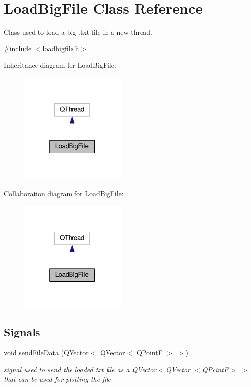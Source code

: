 \hypertarget{classLoadBigFile}{}\section{Load\+Big\+File Class Reference}
\label{classLoadBigFile}


Class used to load a big .txt file in a new thread.  




{\ttfamily \#include $<$loadbigfile.\+h$>$}



Inheritance diagram for Load\+Big\+File\+:
\nopagebreak
\begin{figure}[H]
\begin{center}
\leavevmode
\includegraphics[width=148pt]{classLoadBigFile__inherit__graph}
\end{center}
\end{figure}


Collaboration diagram for Load\+Big\+File\+:
\nopagebreak
\begin{figure}[H]
\begin{center}
\leavevmode
\includegraphics[width=148pt]{classLoadBigFile__coll__graph}
\end{center}
\end{figure}
\subsection*{Signals}
\begin{DoxyCompactItemize}
\item 
void \hyperlink{classLoadBigFile_ad0c00cd9faeeb4e03a94f530152c69d9}{send\+File\+Data} (Q\+Vector$<$ Q\+Vector$<$ Q\+PointF $>$ $>$)
\begin{DoxyCompactList}\small\item\em signal used to send the loaded txt file as a Q\+Vector$<$Q\+Vector $<$\+Q\+Point\+F$>$ $>$ that can be used for plotting the file \end{DoxyCompactList}\end{DoxyCompactItemize}
